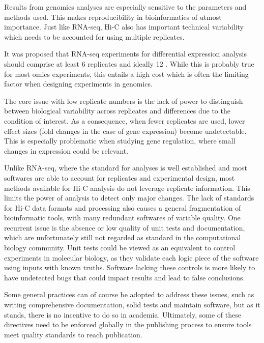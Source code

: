 Results from genomics analyses are especially sensitive to the parameters and methods used. This makes reproducibility in bioinformatics of utmost importance. Just like RNA-seq, Hi-C also has important technical variability which needs to be accounted for using multiple replicates.

It was proposed that RNA-seq experiments for differential expression analysis should comprise at least 6 replicates and ideally 12 \cite{schurchHowManyBiological2016}. While this is probably true for most omics experiments, this entails a high cost which is often the limiting factor when designing experiments in genomics.

The core issue with low replicate numbers is the lack of power to distinguish between biological variability across replicates and differences due to the condition of interest. As a consequence, when fewer replicates are used, lower effect sizes (fold changes in the case of gene expression) become undetectable. This is especially problematic when studying gene regulation, where small changes in expression could be relevant.


Unlike RNA-seq, where the standard for analyses is well established and most softwares are able to account for replicates and experimental design, most methods available for Hi-C analysis do not leverage replicate information. This limits the power of analysis to detect only major changes. The lack of standards for Hi-C data formats and processing also causes a general fragmentation of bioinformatic tools, with many redundant softwares of variable quality. One recurrent issue is the absence or low quality of unit tests and documentation, which are unfortunately still not regarded as standard in the computational biology community. Unit tests could be viewed as an equivalent to control experiments in molecular biology, as they validate each logic piece of the software using inputs with known truths. Software lacking these controls is more likely to have undetected bugs that could impact results and lead to false conclusions.

Some general practices can of course be adopted to address these issues, such as writing comprehensive documentation, solid tests and maintain software, but as it stands, there is no incentive to do so in academia. Ultimately, some of these directives need to be enforced globally in the publishing process to ensure tools meet quality standards to reach publication.

